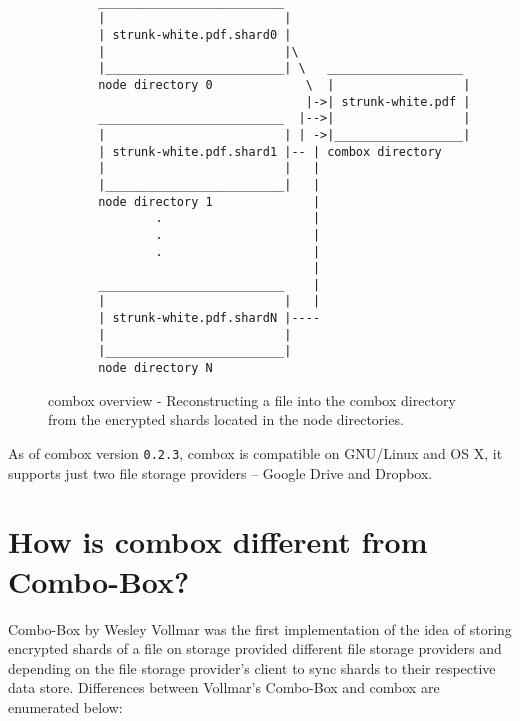 \begin{figure}[h]
\begin{verbatim}

       __________________________
       |                         |
       | strunk-white.pdf.shard0 |
       |                         |\
       |_________________________| \   ___________________
       node directory 0             \  |                  |
                                    |->| strunk-white.pdf |
       __________________________  |-->|                  |
       |                         | | ->|__________________|
       | strunk-white.pdf.shard1 |-- | combox directory
       |                         |   |
       |_________________________|   |
       node directory 1              |
               .                     |
               .                     |
               .                     |
                                     |
       __________________________    |
       |                         |   |
       | strunk-white.pdf.shardN |----
       |                         |
       |_________________________|
       node directory N

\end{verbatim}
  \caption{combox overview - Reconstructing a file into the combox
    directory from the encrypted shards located in the node
    directories.}
  \label{fig:1-combox-overview-1}
\end{figure}

As of combox version \verb+0.2.3+, combox is compatible on GNU/Linux
and OS X, it supports just two file storage providers -- Google Drive
and Dropbox.

\section{How is combox different from Combo-Box?}\label{1-sec-cb-diff}

Combo-Box by Wesley Vollmar \cite{vollmar-combo-box} was the first
implementation of the idea of storing encrypted shards of a file on
storage provided different file storage providers and depending on the
file storage provider's client to sync shards to their respective data
store. Differences between Vollmar's Combo-Box and combox are
enumerated below:

